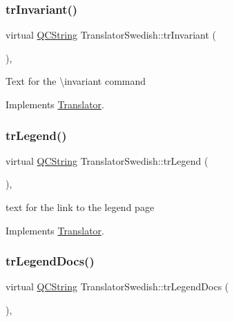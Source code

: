 \subsubsection{\texorpdfstring{trInvariant()}{trInvariant()}}
{\footnotesize\ttfamily virtual \mbox{\hyperlink{class_q_c_string}{Q\+C\+String}} Translator\+Swedish\+::tr\+Invariant (\begin{DoxyParamCaption}{ }\end{DoxyParamCaption})\hspace{0.3cm}{\ttfamily [inline]}, {\ttfamily [virtual]}}

Text for the \textbackslash{}invariant command 

Implements \mbox{\hyperlink{class_translator}{Translator}}.

\mbox{\label{class_translator_swedish_ac2b841ee8deaab254322fe0a2ee402cb}} 
\subsubsection{\texorpdfstring{trLegend()}{trLegend()}}
{\footnotesize\ttfamily virtual \mbox{\hyperlink{class_q_c_string}{Q\+C\+String}} Translator\+Swedish\+::tr\+Legend (\begin{DoxyParamCaption}{ }\end{DoxyParamCaption})\hspace{0.3cm}{\ttfamily [inline]}, {\ttfamily [virtual]}}

text for the link to the legend page 

Implements \mbox{\hyperlink{class_translator}{Translator}}.

\mbox{\label{class_translator_swedish_a4ec9cde6a7bd7bec588f22bfce8977ab}} 
\subsubsection{\texorpdfstring{trLegendDocs()}{trLegendDocs()}}
{\footnotesize\ttfamily virtual \mbox{\hyperlink{class_q_c_string}{Q\+C\+String}} Translator\+Swedish\+::tr\+Legend\+Docs (\begin{DoxyParamCaption}{ }\end{DoxyParamCaption})\hspace{0.3cm}{\ttfamily [inline]}, {\ttfamily [virtual]}}


